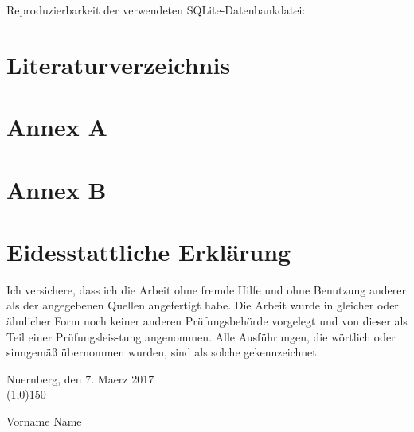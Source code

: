 \documentclass[12pt]{article}
\newcounter{savepage}
\begin{document}
Reproduzierbarkeit der verwendeten SQLite-Datenbankdatei:



\cleardoublepage

\section*{Literaturverzeichnis}
\markright{ } %
\setcounter{page}{\thesavepage}
\lipsum[1]
\cleardoublepage

\section*{Annex A}
\lipsum[5]
\cleardoublepage

\section*{Annex B}
\lipsum[6]
\cleardoublepage

\section*{Eidesstattliche Erklärung}
\markright{ } %
\vspace{2cm}
Ich versichere, dass ich die Arbeit ohne fremde Hilfe und ohne Benutzung anderer als der angegebenen Quellen angefertigt habe.  Die Arbeit wurde in gleicher oder ähnlicher Form noch keiner anderen Prüfungsbehörde vorgelegt  und von dieser als Teil einer Prüfungsleis-tung angenommen. Alle Ausführungen, die wörtlich oder sinngemäß übernommen wurden, sind als solche gekennzeichnet.\\
\vspace{2cm}

\begin{flushleft}
	Nuernberg, den 7. Maerz 2017\\
	\vspace{3cm}
	\line(1,0){150}\\
\end{flushleft}
Vorname Name
\cleardoublepage
\end{document}
